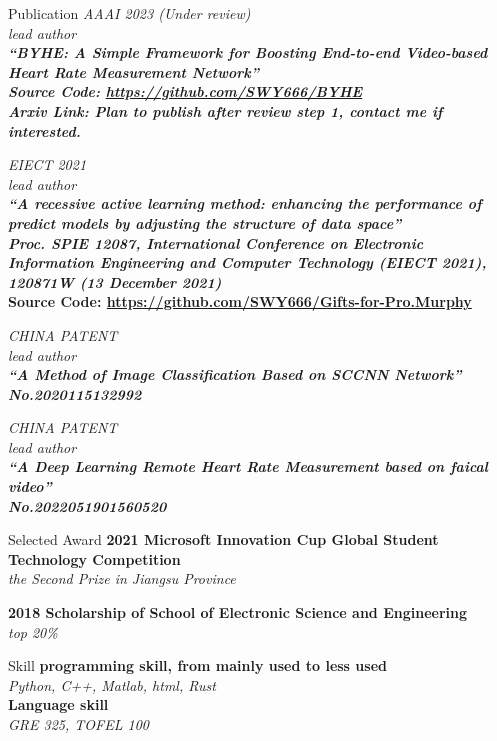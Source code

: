 \documentclass{resume} %
\begin{document}
\begin{rSection}{Publication}
    {\em AAAI 2023 (Under review) \\ lead author\\ \bf ``BYHE: A Simple Framework for Boosting End-to-end Video-based Heart Rate Measurement Network'' \\ Source Code: \url{https://github.com/SWY666/BYHE} \\ \em Arxiv Link: Plan to publish after review step 1, contact me if interested.}

    {\em EIECT 2021 \\ lead author \\ \bf ``A recessive active learning method: enhancing the performance of predict models by adjusting the structure of data space'' \\ \em Proc. SPIE 12087, International Conference on Electronic Information Engineering and Computer Technology (EIECT 2021), 120871W (13 December 2021)} \\ \bf Source Code: \url{https://github.com/SWY666/Gifts-for-Pro.Murphy}

    {\em CHINA PATENT \\ lead author \\ \bf ``A Method of Image Classification Based on SCCNN Network'' \\ \em No.2020115132992}

    {\em CHINA PATENT \\ lead author \\ \bf ``A Deep Learning Remote Heart Rate Measurement based on faical video'' \\ \em No.2022051901560520}

\end{rSection}

\begin{rSection}{Selected Award}
    {{\bf 2021 Microsoft Innovation Cup Global Student Technology Competition} \\ \hfill {\em the Second Prize in Jiangsu Province}}

    {{\bf 2018 Scholarship of School of Electronic Science and Engineering} \\ \hfill {\em top 20\%}}
\end{rSection}

\begin{rSection}{Skill}
    {\bf programming skill, from mainly used to less used} \\
    \hfill {\em Python, C++, Matlab, html, Rust} \\
    {\bf Language skill} \\
    \hfill {\em GRE 325, TOFEL 100}

\end{rSection}
\end{document}
